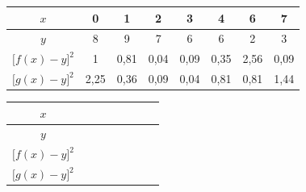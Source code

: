 {	\begin{center}
\def\arraystretch{1.3}
\setlength\tabcolsep{20pt}
	\begin{tabular}{|*{8}{c|}}\hline
		$x$ & 0 & 1 & 2 & 3 & 4 & 6 & 7
 		\\\hline
		$y$ & 8 & 9 & 7 & 6 & 6 & 2 & 3
		\\\hline
		$\bigl[f(x)-y\bigr]^2$ & 1 & 0,81 & 0,04 & 0,09 & 0,35 & 2,56 & 0,09
		\\\hline
		$\bigl[g(x)-y\bigr]^2$ & 2,25 & 0,36 & 0,09 & 0,04 & 0,81 & 0,81 & 1,44
		\\\hline
	\end{tabular}
	\end{center}
}
	\begin{center}
	
\def\arraystretch{1.3}
\setlength\tabcolsep{25pt}
	\begin{tabular}{|*{8}{c|}}\hline
		$x$ & & & & & & &
		\\\hline
		$y$ & & & & & & &
		\\\hline
		$\bigl[f(x)-y\bigr]^2$ & & & & & & &
		\\\hline
		$\bigl[g(x)-y\bigr]^2$ & & & & & & &
		\\\hline
	\end{tabular}
	\end{center}

